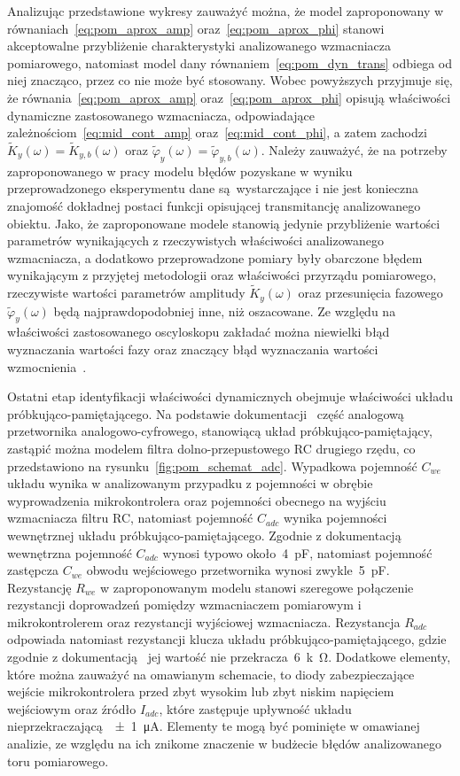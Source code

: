 Analizując przedstawione wykresy zauważyć można, że model zaproponowany w równaniach~\eqref{eq:pom_aprox_amp} oraz~\eqref{eq:pom_aprox_phi} stanowi akceptowalne przybliżenie charakterystyki analizowanego wzmacniacza pomiarowego, natomiast model dany równaniem~\eqref{eq:pom_dyn_trans} odbiega od niej znacząco, przez co nie może być stosowany. Wobec powyższych przyjmuje się, że równania~\eqref{eq:pom_aprox_amp} oraz~\eqref{eq:pom_aprox_phi} opisują właściwości dynamiczne zastosowanego wzmacniacza, odpowiadające zależnościom~\eqref{eq:mid_cont_amp} oraz~\eqref{eq:mid_cont_phi}, a zatem zachodzi $\tilde{K}_{y}(\omega) = \tilde{K}_{y,b}(\omega)$ oraz $\tilde{\varphi}_{y}(\omega) = \tilde{\varphi}_{y,b}(\omega)$. Należy zauważyć, że na potrzeby zaproponowanego w pracy modelu błędów pozyskane w wyniku przeprowadzonego eksperymentu dane są wystarczające i nie jest konieczna znajomość dokładnej postaci funkcji opisującej transmitancję analizowanego obiektu. Jako, że zaproponowane modele stanowią jedynie przybliżenie wartości parametrów wynikających z rzeczywistych właściwości analizowanego wzmacniacza, a dodatkowo przeprowadzone pomiary były obarczone błędem wynikającym z przyjętej metodologii oraz właściwości przyrządu pomiarowego, rzeczywiste wartości parametrów amplitudy $\tilde{K}_{y}(\omega)$ oraz przesunięcia fazowego $\tilde{\varphi}_{y}(\omega)$ będą najprawdopodobniej inne, niż oszacowane. Ze względu na właściwości zastosowanego oscyloskopu zakładać można niewielki błąd wyznaczania wartości fazy oraz znaczący błąd wyznaczania wartości wzmocnienia~\cite{rigol_dso}.

Ostatni etap identyfikacji właściwości dynamicznych obejmuje właściwości układu próbkująco-pamiętającego. Na podstawie dokumentacji~\cite{stm_f411} część analogową przetwornika analogowo-cyfrowego, stanowiącą układ próbkująco-pamiętający, zastąpić można modelem filtra dolno-przepustowego RC drugiego rzędu, co przedstawiono na rysunku~\ref{fig:pom_schemat_adc}. Wypadkowa pojemność $C_{we}$ układu wynika w analizowanym przypadku z pojemności w obrębie wyprowadzenia mikrokontrolera oraz pojemności obecnego na wyjściu wzmacniacza filtru RC, natomiast pojemność $C_{adc}$ wynika pojemności wewnętrznej układu próbkująco-pamiętającego. Zgodnie z dokumentacją~\cite{stm_f411} wewnętrzna pojemność $C_{adc}$ wynosi typowo około~\qty{4}{pF}, natomiast pojemność zastępcza $C_{we}$ obwodu wejściowego przetwornika wynosi zwykle~\qty{5}{pF}. Rezystancję $R_{we}$ w zaproponowanym modelu stanowi szeregowe połączenie rezystancji doprowadzeń pomiędzy wzmacniaczem pomiarowym i mikrokontrolerem oraz rezystancji wyjściowej wzmacniacza. Rezystancja $R_{adc}$ odpowiada natomiast rezystancji klucza układu próbkująco-pamiętającego, gdzie zgodnie z dokumentacją~\cite{stm_f411} jej wartość nie przekracza~\qty{6}{k\ohm}. Dodatkowe elementy, które można zauważyć na omawianym schemacie, to diody zabezpieczające wejście mikrokontrolera przed zbyt wysokim lub zbyt niskim napięciem wejściowym oraz źródło $I_{adc}$, które zastępuje upływność układu nieprzekraczającą~\qty{\pm 1}{\micro A}. Elementy te mogą być pominięte w omawianej analizie, ze względu na ich znikome znaczenie w budżecie błędów analizowanego toru pomiarowego.

